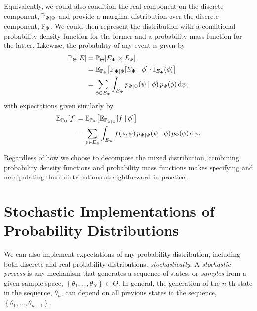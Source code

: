 Equivalently, we could also condition the real component on the
discrete component, $\mathbb{P}_{\Psi \mid \Phi}$ and provide a marginal 
distribution over the discrete component, $\mathbb{P}_{\Phi}$.  We could 
then represent the distribution with a conditional probability density 
function for the former and a probability mass function for the latter.  
Likewise, the probability of any event is given by
%
\begin{align*}
\mathbb{P}_{\Theta} \! \left[ E \right]
&=
\mathbb{P}_{\Theta} \! \left[ E_{\Phi} \times E_{\Psi} \right]
\\
&=
\mathbb{E}_{\mathbb{P}_{\Phi}} \! \left[
\mathbb{P}_{\Psi \mid \Phi} \! \left[  E_{\Psi} \mid \phi \right]
\cdot
\mathbb{I}_{E_{\Phi}} \! \left( \phi \right)
\right] 
\\
&= 
\sum_{\phi \in E_{\Phi} } \int_{E_{\Psi} }
p_{\Psi \mid \Phi} \! \left( \psi \mid \phi \right) 
p_{\Phi} \! \left( \phi \right) \mathrm{d} \psi,
\end{align*}
%
with expectations given similarly by
%
\begin{align*}
\mathbb{E}_{\mathbb{P}_{\Theta}} \! \left[ f \right]
&=
\mathbb{E}_{\mathbb{P}_{\Phi}} \! \left[
\mathbb{E}_{\mathbb{P}_{\Psi \mid \Phi}} \! \left[  f \mid \phi \right]
\right] 
\\
&= 
\sum_{\phi \in E_{\Phi} } \int_{E_{\Psi} }
f \! \left( \phi, \psi \right) 
p_{\Psi \mid \Phi} \! \left( \psi \mid \phi \right)
p_{\Phi} \! \left( \phi \right) \mathrm{d} \psi.
\end{align*}

Regardless of how we choose to decompose the mixed distribution,
combining probability density functions and probability mass functions
makes specifying and manipulating these distributions straightforward in
practice.

\section{Stochastic Implementations of Probability Distributions}

We can also implement expectations of any probability distribution, 
including both discrete and real probability distributions, \emph{stochastically}.  
A \emph{stochastic process} is any mechanism that generates a 
sequence of states, or \emph{samples} from a given sample space, 
$\left\{ \theta_{1}, \ldots, \theta_{N} \right\} \subset \Theta$.  In general,
the generation of the $n$-th state in the sequence, $\theta_{n}$, can
depend on all previous states in the sequence, 
$\left\{ \theta_{1}, \ldots, \theta_{n - 1} \right\}$.

